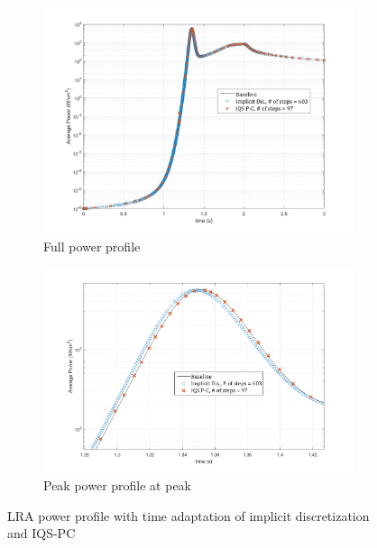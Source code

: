 \documentclass{elsarticle}
\newcommand{\iqspc}{IQS-PC\xspace}
\begin{document}
\begin{figure}[!htbp]
\centering
\begin{subfigure}[!htbp]{0.49\textwidth}
\includegraphics[width=\textwidth]{figures/LRA_DT2.png}
\caption{Full power profile}
\end{subfigure}
\begin{subfigure}[!htbp]{0.49\textwidth}
\includegraphics[width=\textwidth]{figures/LRA_DT2_peak.png}
\caption{Peak power profile at peak}
\end{subfigure}
\caption{LRA power profile with time adaptation of implicit discretization and \iqspc}
\label{fig:lra_dt2}
\end{figure}
\end{document}
